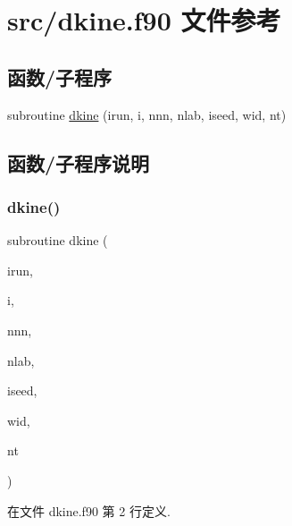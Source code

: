\hypertarget{dkine_8f90}{}\section{src/dkine.f90 文件参考}
\label{dkine_8f90}
\subsection*{函数/子程序}
\begin{DoxyCompactItemize}
\item 
subroutine \mbox{\hyperlink{dkine_8f90_a6ec7cb327d5efeb499a7c95b630aa375}{dkine}} (irun, i, nnn, nlab, iseed, wid, nt)
\end{DoxyCompactItemize}


\subsection{函数/子程序说明}
\mbox{\label{dkine_8f90_a6ec7cb327d5efeb499a7c95b630aa375}} 
\subsubsection{\texorpdfstring{dkine()}{dkine()}}
{\footnotesize\ttfamily subroutine dkine (\begin{DoxyParamCaption}\item[{}]{irun,  }\item[{}]{i,  }\item[{}]{nnn,  }\item[{}]{nlab,  }\item[{}]{iseed,  }\item[{}]{wid,  }\item[{}]{nt }\end{DoxyParamCaption})}



在文件 dkine.\+f90 第 2 行定义.

